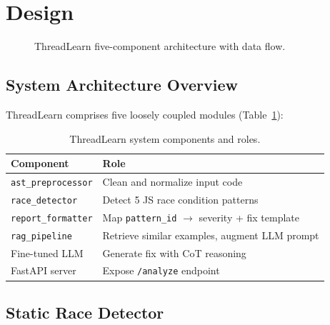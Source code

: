 \documentclass[11pt]{article}
\begin{document}
\section{Design}
\label{sec:design}

\begin{figure}[ht]
  \centering
  \caption{ThreadLearn five-component architecture with data flow.}
  \label{fig:arch}
\end{figure}

\subsection{System Architecture Overview}

ThreadLearn comprises five loosely coupled modules (Table~\ref{tab:components}):

\begin{table}[ht]
  \centering
  \caption{ThreadLearn system components and roles.}
  \label{tab:components}
  \begin{tabular}{@{}ll@{}}
    \toprule
    \textbf{Component} & \textbf{Role} \\
    \midrule
    \texttt{ast\_preprocessor} & Clean and normalize input code \\
    \texttt{race\_detector}    & Detect 5 JS race condition patterns \\
    \texttt{report\_formatter} & Map \texttt{pattern\_id} $\to$ severity + fix template \\
    \texttt{rag\_pipeline}     & Retrieve similar examples, augment LLM prompt \\
    Fine-tuned LLM             & Generate fix with CoT reasoning \\
    FastAPI server             & Expose \texttt{/analyze} endpoint \\
    \bottomrule
  \end{tabular}
\end{table}

\subsection{Static Race Detector}
\label{sec:design:detector}
\end{document}
